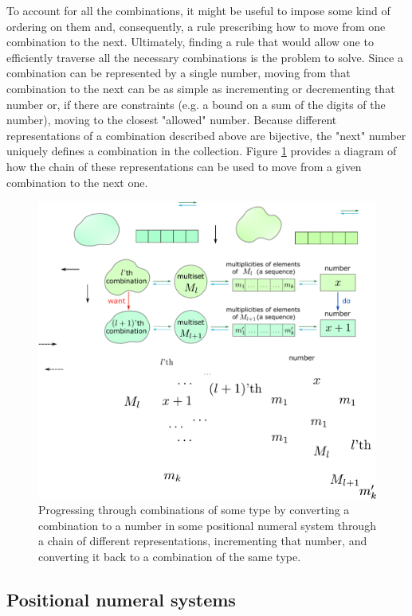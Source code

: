 \documentclass[11pt]{article}
\begin{document}
To account for all the combinations, it might be useful to impose some kind of ordering on them and, consequently, a rule prescribing how to move from one combination to the next. Ultimately, finding a rule that would allow one to efficiently traverse all the necessary combinations is the problem to solve. Since a combination can be represented by a single number, moving from that combination to the next can be as simple as incrementing or decrementing that number or, if there are constraints (e.g. a bound on a sum of the digits of the number), moving to the closest "allowed" number. Because different representations of a combination described above are bijective, the "next" number uniquely defines a combination in the collection. Figure \ref{fig:diag1} provides a diagram of how the chain of these representations can be used to move from a given combination to the next one. 

\begin{figure}
  \centering
  \includegraphics[scale = 0.81]{suppl/diagram1a.pdf}
  \caption{Progressing through combinations of some type by converting a combination to a number in some positional numeral system through a chain of different representations, incrementing that number, and converting it back to a combination of the same type.}
  \label{fig:diag1}
\end{figure}

\subsection*{Positional numeral systems}
\end{document}
